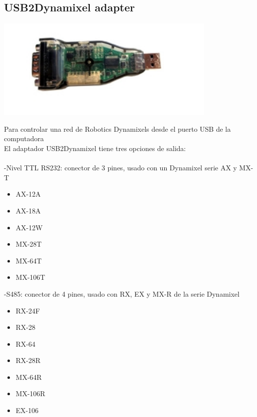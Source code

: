 \documentclass[a4paper]{book}
\begin{document}
\subsection{USB2Dynamixel adapter}

\begin{center}
\includegraphics[width=0.8\textwidth]{Figures/Hardware/Partes/Dynamixel.png}
\label{fig:Hardware:Partes:Dynamixel}
\end{center}

Para controlar una red de Robotics Dynamixels desde el puerto USB de la computadora\\
El adaptador USB2Dynamixel tiene tres opciones de salida:\\
\\
-Nivel TTL RS232: conector de 3 pines, usado con un Dynamixel serie AX y MX-T\\
 \begin{itemize}
\item{AX-12A}
\item{AX-18A}
\item{AX-12W}
\item{MX-28T}
\item{MX-64T}
\item{MX-106T}
\\
\end{itemize}
-S485: conector de 4 pines, usado con RX, EX y MX-R de la serie Dynamixel\\

\begin{itemize}
\item{RX-24F}
\item{RX-28}
\item{RX-64}
\item{RX-28R}
\item{MX-64R}
\item{MX-106R}
\item{EX-106}
\end{itemize}
\end{document}
